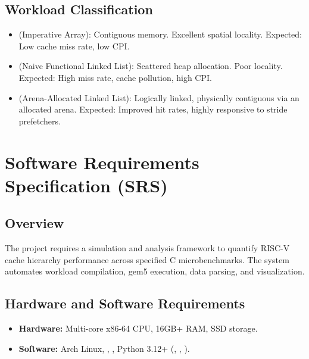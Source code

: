 \documentclass[12pt, a4paper]{report}
\begin{document}
\section{Workload Classification}
\begin{itemize}
    \item \textbf{} (Imperative Array): Contiguous memory. Excellent spatial locality. Expected: Low cache miss rate, low CPI.
    \item \textbf{} (Naive Functional Linked List): Scattered heap allocation. Poor locality. Expected: High miss rate, cache pollution, high CPI.
    \item \textbf{} (Arena-Allocated Linked List): Logically linked, physically contiguous via an allocated arena. Expected: Improved hit rates, highly responsive to stride prefetchers.
\end{itemize}

\chapter{Software Requirements Specification (SRS)}
\section{Overview}
The project requires a simulation and analysis framework to quantify RISC-V cache hierarchy performance across specified C microbenchmarks. The system automates workload compilation, gem5 execution, data parsing, and visualization.

\section{Hardware and Software Requirements}
\begin{itemize}
    \item \textbf{Hardware:} Multi-core x86-64 CPU, 16GB+ RAM, SSD storage.
    \item \textbf{Software:} Arch Linux, , , Python 3.12+ (, , ).
\end{itemize}
\end{document}
